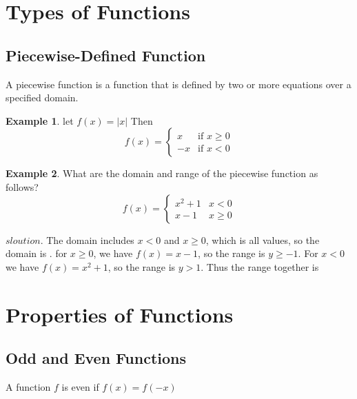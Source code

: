 \documentclass[a4paper]{article}
\theoremstyle{definition}
\newtheorem{exmp}{Example}[section]
\begin{document}
\section{Types of Functions}
\subsection{Piecewise-Defined Function}
A piecewise function is a function that is defined by two or more equations over a
specified domain.

\begin{exmp}
    let \(f(x) = |x|\) Then
    \[ f(x) =
        \begin{cases}
            x  & \text{if } x \ge 0 \\
            -x & \text{if } x < 0
        \end{cases}
    \]

\end{exmp}

\begin{exmp}
    What are the domain and range of the piecewise function as follows?
    \[
        f(x) =
        \begin{cases}
            x^2 + 1 & x < 0   \\
            x - 1   & x \ge 0
        \end{cases}
    \]
\end{exmp}

\(sloution\). The domain includes \(x < 0 \) and \(x \ge 0\),
which is all values, so the domain is
\framebox[\width]{ \((-\infty, \infty)\) }. for \(x \ge 0\), we have \(f(x) = x - 1\),
so the range is \(y \ge -1\). For \(x < 0\) we have \(f(x) = x^2 + 1\), so the range is \(y > 1\).
Thus the range together is \framebox[\width]{ \([-1, \infty )\) }

\section{Properties of Functions}
\subsection{Odd and Even Functions}
A function \(f\) is even if \(f(x) = f(-x)\)
\end{document}
